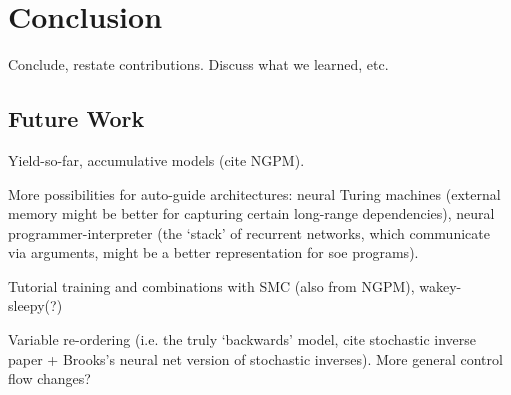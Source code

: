 \section{Conclusion}
\label{sec:conclusion}

Conclude, restate contributions. Discuss what we learned, etc.

\subsection{Future Work}
\label{sec:conclusion_futureWork}

Yield-so-far, accumulative models (cite NGPM).

More possibilities for auto-guide architectures: neural Turing machines (external memory might be better for capturing certain long-range dependencies), neural programmer-interpreter (the `stack' of recurrent networks, which communicate via arguments, might be a better representation for soe programs).

Tutorial training and combinations with SMC (also from NGPM), wakey-sleepy(?)

Variable re-ordering (i.e. the truly `backwards' model, cite stochastic inverse paper + Brooks's neural net version of stochastic inverses). More general control flow changes?
